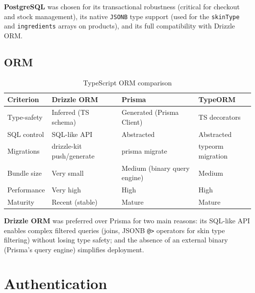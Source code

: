 \textbf{PostgreSQL} was chosen for its transactional robustness (critical for
checkout and stock management), its native \texttt{JSONB} type support
(used for the \texttt{skinType} and \texttt{ingredients} arrays on products),
and its full compatibility with Drizzle ORM.

\subsection{ORM}

\begin{table}[H]
\centering
\caption{TypeScript ORM comparison}
\begin{tabularx}{\textwidth}{|l|X|X|X|}
\hline
\rowcolor{gray!20}
\textbf{Criterion} & \textbf{Drizzle ORM} & \textbf{Prisma} & \textbf{TypeORM} \\
\hline
Type-safety & \cellcolor{green!15}Inferred (TS schema) & Generated (Prisma Client) & TS decorators \\
\hline
SQL control & \cellcolor{green!15}SQL-like API & Abstracted & Abstracted \\
\hline
Migrations & \cellcolor{green!15}drizzle-kit push/generate & prisma migrate & typeorm migration \\
\hline
Bundle size & \cellcolor{green!15}Very small & Medium (binary query engine) & Medium \\
\hline
Performance & \cellcolor{green!15}Very high & High & High \\
\hline
Maturity & Recent (stable) & \cellcolor{green!15}Mature & Mature \\
\hline
\end{tabularx}
\end{table}

\textbf{Drizzle ORM} was preferred over Prisma for two main reasons:
its SQL-like API enables complex filtered queries (joins, JSONB \texttt{@>}
operators for skin type filtering) without losing type safety;
and the absence of an external binary (Prisma's query engine) simplifies deployment.

\section{Authentication}

